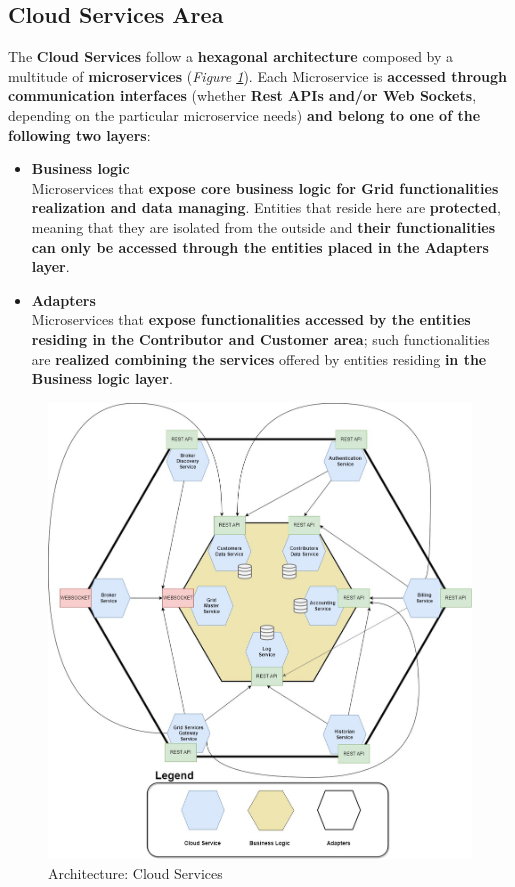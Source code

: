 \subsection{Cloud Services Area}\label{cloud_services_area}
The \textbf{Cloud Services} follow a \textbf{hexagonal architecture} composed by a multitude of \textbf{microservices} (\textit{Figure \ref{fig:architecture_cloud_services}}). Each Microservice is \textbf{accessed through communication interfaces} (whether \textbf{Rest APIs and/or Web Sockets}, depending on the particular microservice needs) \textbf{and belong to one of the following two layers}:
\begin{itemize}
    \item \textbf{Business logic}\\
    Microservices that \textbf{expose core business logic for Grid functionalities realization and data managing}. Entities that  reside here are \textbf{protected}, meaning that they are isolated from the outside and \textbf{their functionalities can only be accessed through the entities placed in the Adapters layer}.
    \item \textbf{Adapters}\\
    Microservices that \textbf{expose functionalities accessed by the entities residing in the Contributor and Customer area}; such functionalities are \textbf{realized combining the services} offered by entities residing \textbf{in the Business logic layer}.
\end{itemize}
\begin{figure}[!ht]
    \centering
    \includegraphics[scale=0.35]{document/chapters/chapter_6/images/architecture_cloud_services.jpg}
    \caption{Architecture: Cloud Services}
    \label{fig:architecture_cloud_services}
\end{figure}


